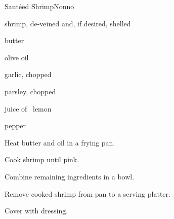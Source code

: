 \begin{recipe}{Saut\'eed Shrimp}{Nonno}{}

\begin{ingredients}
\item shrimp, de-veined and, if desired, shelled
\item butter
\item olive oil
\item garlic, chopped
\item parsley, chopped
\item juice of \half~lemon
\item pepper
\end{ingredients}

\begin{directions}
\item Heat butter and oil in a frying pan.
\item Cook shrimp until pink.
\item Combine remaining ingredients in a bowl.
\item Remove cooked shrimp from pan to a serving platter.
\item Cover with dressing.
\end{directions}

\end{recipe}
